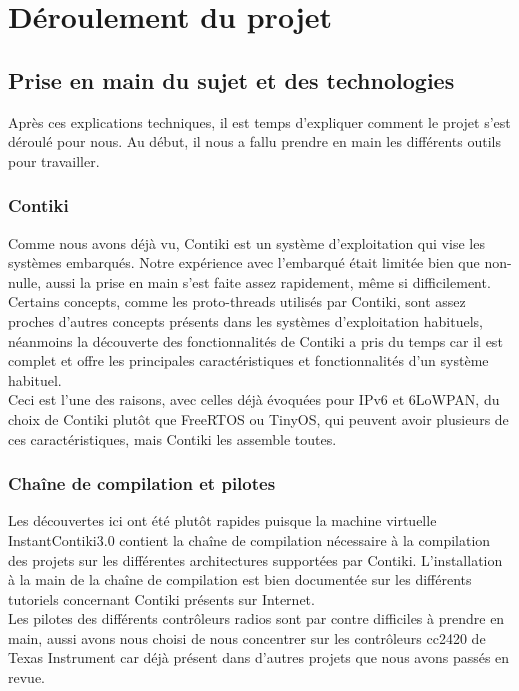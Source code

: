 \chapter{Déroulement du projet}
\label{sec:deroulement}

\section{Prise en main du sujet et des technologies}
	Après ces explications techniques, il est temps d'expliquer comment le projet s'est déroulé pour nous. Au début, il nous a fallu prendre en main les différents outils pour travailler.
	
	\subsection{Contiki}
	Comme nous avons déjà vu, Contiki est un système d'exploitation qui vise les systèmes embarqués. Notre expérience avec l'embarqué était limitée bien que non-nulle, aussi la prise en main s'est faite assez rapidement, même si difficilement.\\
	Certains concepts, comme les proto-threads utilisés par Contiki, sont assez proches d'autres concepts présents dans les systèmes d'exploitation habituels, néanmoins la découverte des fonctionnalités de Contiki a pris du temps car il est complet et offre les principales caractéristiques et fonctionnalités d'un système habituel.\\
	Ceci est l'une des raisons, avec celles déjà évoquées pour IPv6 et 6LoWPAN, du choix de Contiki plutôt que FreeRTOS ou TinyOS, qui peuvent avoir plusieurs de ces caractéristiques, mais Contiki les assemble toutes.

	\subsection{Chaîne de compilation et pilotes}
	Les découvertes ici ont été plutôt rapides puisque la machine virtuelle InstantContiki3.0 contient la chaîne de compilation nécessaire à la compilation des projets sur les différentes architectures supportées par Contiki. L'installation à la main de la chaîne de compilation est bien documentée sur les différents tutoriels concernant Contiki présents sur Internet.\\
	Les pilotes des différents contrôleurs radios sont par contre difficiles à prendre en main, aussi avons nous choisi de nous concentrer sur les contrôleurs cc2420 de Texas Instrument car déjà présent dans d'autres projets que nous avons passés en revue.

